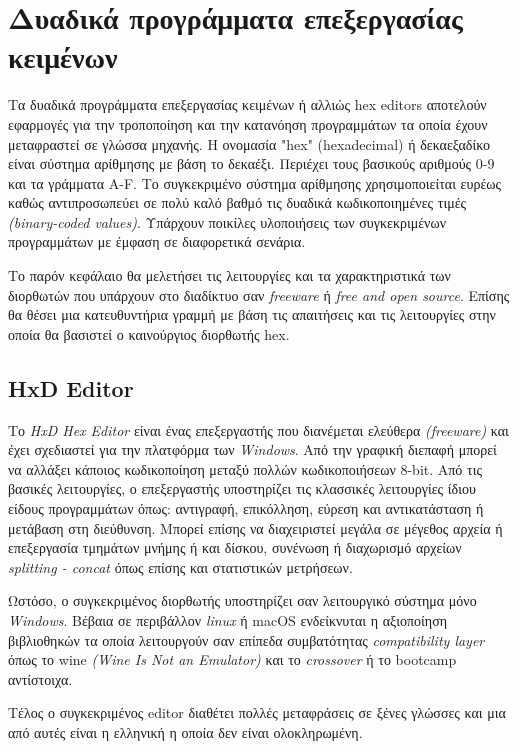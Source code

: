 \section{Δυαδικά προγράμματα επεξεργασίας κειμένων}
Τα δυαδικά προγράμματα επεξεργασίας κειμένων ή αλλιώς hex editors αποτελούν εφαρμογές για την τροποποίηση και την κατανόηση προγραμμάτων τα οποία έχουν μεταφραστεί σε γλώσσα μηχανής.
H ονομασία "hex" (hexadecimal) ή δεκαεξαδίκο είναι σύστημα αρίθμησης με βάση το δεκαέξι.
Περιέχει τους βασικούς αριθμούς 0-9 και τα γράμματα A-F.
Το συγκεκριμένο σύστημα αρίθμησης χρησιμοποιείται ευρέως καθώς αντιπροσωπεύει σε πολύ καλό βαθμό τις δυαδικά κωδικοποιημένες τιμές \emph{(binary-coded values)}.
Υπάρχουν ποικίλες υλοποιήσεις των συγκεκριμένων προγραμμάτων με έμφαση σε διαφορετικά σενάρια.

Το παρόν κεφάλαιο θα μελετήσει τις λειτουργίες και τα χαρακτηριστικά των διορθωτών που υπάρχουν στο διαδίκτυο σαν \emph{freeware} ή  \emph{free and open source}.
Επίσης θα θέσει μια κατευθυντήρια γραμμή με βάση τις απαιτήσεις και τις λειτουργίες στην οποία θα βασιστεί ο καινούργιος διορθωτής hex.

\pagebreak
\subsection{HxD Editor}
Το \emph{HxD Hex Editor}\cite{hxd} είναι ένας επεξεργαστής που διανέμεται ελεύθερα \emph{(freeware)} και έχει σχεδιαστεί για την πλατφόρμα των \emph{Windows}.
Από την γραφική διεπαφή μπορεί να αλλάξει κάποιος κωδικοποίηση μεταξύ πολλών κωδικοποιήσεων 8-bit.
Από τις βασικές λειτουργίες, ο επεξεργαστής υποστηρίζει τις κλασσικές λειτουργίες ίδιου είδους προγραμμάτων όπως: αντιγραφή, επικόλληση, εύρεση και αντικατάσταση ή μετάβαση στη διεύθυνση.
Μπορεί επίσης να διαχειριστεί μεγάλα σε μέγεθος αρχεία ή επεξεργασία τμημάτων μνήμης ή και δίσκου, συνένωση ή διαχωρισμό αρχείων \emph{splitting - concat} όπως επίσης και στατιστικών μετρήσεων.

Ωστόσο, ο συγκεκριμένος διορθωτής υποστηρίζει σαν λειτουργικό σύστημα μόνο \emph{Windows}.
Βέβαια σε περιβάλλον \emph{linux} ή {macOS} ενδείκνυται η αξιοποίηση βιβλιοθηκών τα οποία λειτουργούν σαν επίπεδα συμβατότητας \emph{compatibility layer} όπως το wine \emph{(Wine Is Not an Emulator)} και το \emph{crossover} ή το {bootcamp} αντίστοιχα.

Τέλος ο συγκεκριμένος editor διαθέτει πολλές μεταφράσεις σε ξένες γλώσσες και μια από αυτές είναι η ελληνική η οποία δεν είναι ολοκληρωμένη.

